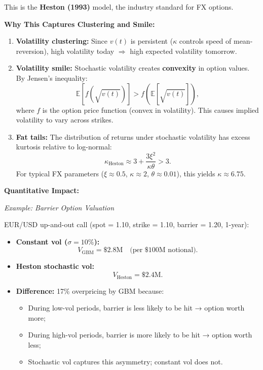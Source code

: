 This is the \textbf{Heston (1993)} model, the industry standard for FX options.

\textbf{Why This Captures Clustering and Smile:}

\begin{enumerate}
	\item \textbf{Volatility clustering:} Since $v(t)$ is persistent ($\kappa$ controls speed of mean-reversion), high volatility today $\Rightarrow$ high expected volatility tomorrow.
	
	\item \textbf{Volatility smile:} Stochastic volatility creates \textbf{convexity} in option values. By Jensen's inequality:
	\begin{equation}
		\mathbb{E}[f(\sqrt{v(t)})] > f(\mathbb{E}[\sqrt{v(t)}]),
	\end{equation}
	where $f$ is the option price function (convex in volatility). This causes implied volatility to vary across strikes.
	
	\item \textbf{Fat tails:} The distribution of returns under stochastic volatility has excess kurtosis relative to log-normal:
	\begin{equation}
		\kappa_{\text{Heston}} \approx 3 + \frac{3\xi^2}{\kappa\theta} > 3.
	\end{equation}
	For typical FX parameters ($\xi \approx 0.5$, $\kappa \approx 2$, $\theta \approx 0.01$), this yields $\kappa \approx 6.75$.
\end{enumerate}

\textbf{Quantitative Impact:}

\textit{Example: Barrier Option Valuation}

EUR/USD up-and-out call (spot = 1.10, strike = 1.10, barrier = 1.20, 1-year):

\begin{itemize}
	\item \textbf{Constant vol ($\sigma = 10\%$):}
	\begin{equation}
		V_{\text{GBM}} = \$2.8\text{M} \quad \text{(per \$100M notional)}.
	\end{equation}
	
	\item \textbf{Heston stochastic vol:}
	\begin{equation}
		V_{\text{Heston}} = \$2.4\text{M}.
	\end{equation}
	
	\item \textbf{Difference:} 17\% overpricing by GBM because:
	\begin{itemize}
		\item During low-vol periods, barrier is less likely to be hit → option worth more;
		\item During high-vol periods, barrier is more likely to be hit → option worth less;
		\item Stochastic vol captures this asymmetry; constant vol does not.
	\end{itemize}
\end{itemize}

